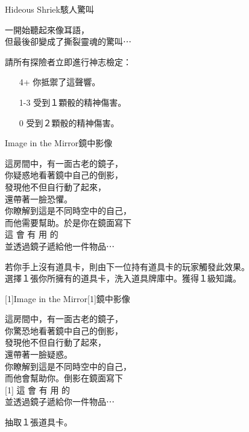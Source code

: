 %
\begin{EventCard}{Hideous Shriek}{駭人驚叫}

  \begin{CardStory}
    一開始聽起來像耳語，\\
    但最後卻變成了撕裂靈魂的驚叫⋯
  \end{CardStory}

  請所有探險者立即進行神志檢定：
  \begin{itemize}
    \item[4+] 你抵禦了這聲響。
    \item[1-3] 受到１顆骰的精神傷害。
    \item[0] 受到２顆骰的精神傷害。
  \end{itemize}

\end{EventCard}%
%
\begin{EventCard}{Image in the Mirror}{鏡中影像}

  \begin{CardStory}
    這房間中，有一面古老的鏡子，\\
    你疑惑地看著鏡中自己的倒影，\\
    發現他不但自行動了起來，\\
    還帶著一臉恐懼。\\
    你瞭解到這是不同時空中的自己，\\
    而他需要幫助。於是你在鏡面寫下\\[0.5em]
    { \FontScript 這 \enskip 會 \enskip 有 \enskip 用 \enskip 的 }\\[0.5em]
    並透過鏡子遞給他一件物品⋯
\end{CardStory}

  若你手上沒有道具卡，則由下一位持有道具卡的玩家觸發此效果。\\[0.5em]
  選擇１張你所擁有的道具卡，洗入道具牌庫中。獲得１級知識。\\[0.5em]

\end{EventCard}%
%
\begin{EventCard}{\scalebox{-1}[1]{Image in the Mirror}}{\scalebox{-1}[1]{鏡中影像}}

  \begin{CardStory}
    這房間中，有一面古老的鏡子，\\
    你驚恐地看著鏡中自己的倒影，\\
    發現他不但自行動了起來，\\
    還帶著一臉疑惑。\\
    你瞭解到這是不同時空中的自己，\\
    而他會幫助你。倒影在鏡面寫下\\[0.5em]
    \scalebox{-1}[1]{ \FontScript 這 \enskip 會 \enskip 有 \enskip 用 \enskip 的 }\\[0.5em]
    並透過鏡子遞給你一件物品⋯
\end{CardStory}

  抽取１張道具卡。\\[0.5em]

\end{EventCard}%
